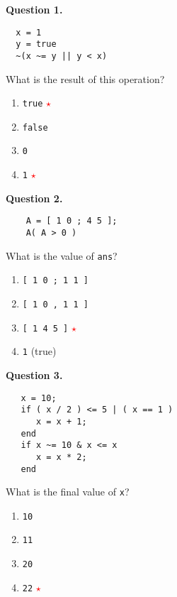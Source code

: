 \documentclass[12pt]{article}
\newcommand{\correctstar}{{\Large\textcolor{red}{$\star$}}}
\begin{document}
\bigskip

\bigskip


{\bf Question 1.}     

  \begin{Verbatim}
  x = 1
  y = true
  ~(x ~= y || y < x)
  \end{Verbatim}
  
  What is the result of this operation?
  
  \begin{enumerate}[label=\Alph*]
  	\item  \texttt{true}  \correctstar
  	\item  \texttt{false}
  	\item  \texttt{0}
  	\item  \texttt{1}  \correctstar
  \end{enumerate}



{\bf Question 2.} 
    \begin{Verbatim}
    A = [ 1 0 ; 4 5 ];
    A( A > 0 )
    \end{Verbatim}
    
    What is the value of \texttt{ans}?
    
    \begin{enumerate}[label=\Alph*]
    	\item  \texttt{[ 1 0 ; 1 1 ]}
    	\item  \texttt{[ 1 0 , 1 1 ]}
    	\item  \texttt{[ 1 4 5 ]}  \correctstar
    	\item  \texttt{1}  (true)
    \end{enumerate}

{\bf Question 3.} 
   \begin{Verbatim}
   x = 10;
   if ( x / 2 ) <= 5 | ( x == 1 )
      x = x + 1;
   end
   if x ~= 10 & x <= x
      x = x * 2;
   end
   \end{Verbatim}
   
   What is the final value of \texttt{x}?
   
   \begin{enumerate}[label=\Alph*]
   	\item  \texttt{10}
   	\item  \texttt{11}
   	\item  \texttt{20}
   	\item  \texttt{22}  \correctstar
   \end{enumerate}
\end{document}

